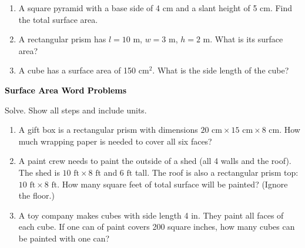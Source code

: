 \documentclass[12pt, letterpaper, fleqn]{article}
\begin{document}
\begin{enumerate}[itemsep=2.3cm, leftmargin=0.6cm]

\item A square pyramid with a base side of 4 cm and a slant height of 5 cm. Find the total surface area.

\vspace{2.2cm}

\item A rectangular prism has $l = 10\text{ m}$, $w = 3\text{ m}$, $h = 2\text{ m}$. What is its surface area?

\vspace{2.2cm}

\item A cube has a surface area of 150 cm$^2$. What is the side length of the cube?

\vspace{2.5cm}

\end{enumerate}

\newpage

\begin{tcolorbox}[colback=black!10]
\large\textcolor{black}{\textbf{Surface Area Word Problems}}
\end{tcolorbox}

\noindent
Solve. Show all steps and include units.

\vspace{3mm}

\begin{enumerate}[itemsep=2.4cm, leftmargin=0.6cm]

\item A gift box is a rectangular prism with dimensions $20\text{ cm} \times 15\text{ cm} \times 8\text{ cm}$. How much wrapping paper is needed to cover all six faces?

\vspace{2.3cm}

\item A paint crew needs to paint the outside of a shed (all 4 walls and the roof). The shed is $10\text{ ft} \times 8\text{ ft}$ and $6\text{ ft}$ tall. The roof is also a rectangular prism top: $10\text{ ft} \times 8\text{ ft}$. How many square feet of total surface will be painted? (Ignore the floor.)

\vspace{2.3cm}

\item A toy company makes cubes with side length 4 in. They paint all faces of each cube. If one can of paint covers 200 square inches, how many cubes can be painted with one can?

\vspace{2.5cm}

\end{enumerate}
\end{document}
